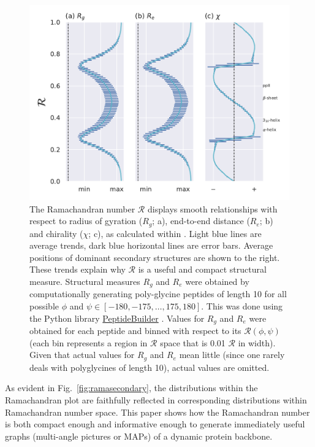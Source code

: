 \documentclass[fleqn,10pt,lineno]{wlpeerj} %
\newcommand{\Fig}[1]{Fig.~\ref{#1}}
\newcommand{\n}[1]{{\color{red}#1}}
\newcommand{\rr}{$\mathcal{R}$\xspace}
\begin{document}
\begin{figure}[t!]
\begin{adjustwidth}{-1in}{0in} %
\centering
\includegraphics[width=0.6\linewidth]{automated_figures/fig_r_intro.pdf}
\caption{The Ramachandran number \rr displays smooth relationships with respect to radius of gyration ($R_g$; a), end-to-end distance ($R_e$; b) and chirality ($\chi$; c), as calculated within \cite{Mannige2017}. Light blue lines are average trends, dark blue horizontal lines are error bars. Average positions of dominant secondary structures are shown to the right. These trends explain why \rr is a useful and compact structural measure. \n{Structural measures $R_g$ and $R_e$ were obtained by computationally generating poly-glycine peptides of length 10 for all possible $\phi$ and $\psi \in [-180,-175,\ldots,175,180]$. This was done using the Python library \href{https://github.com/mtien/PeptideBuilder}{PeptideBuilder} \citep{Tien2013}. Values for $R_g$ and $R_e$ were obtained for each peptide and binned with respect to its {$\mathcal{R}(\phi,\psi)$} (each bin represents a region in \rr space that is 0.01 \rr in width). Given that actual values for $R_g$ and $R_e$ mean little (since one rarely deals with polyglycines of length 10), actual values are omitted.}\label{fig:r_smooth}} 
\end{adjustwidth}
\end{figure}



As evident in \Fig{fig:ramasecondary}, the distributions within the Ramachandran plot are faithfully reflected in corresponding distributions within Ramachandran number space. This paper shows how the Ramachandran number is both compact enough and informative enough to generate immediately useful graphs (multi-angle pictures or MAPs) of a dynamic protein backbone.
\end{document}

